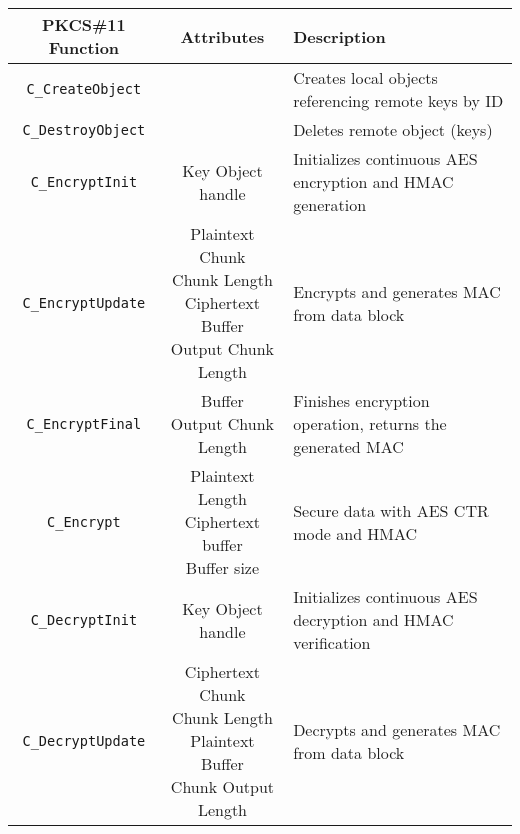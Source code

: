\begin{table}[]
\centering
\def\arraystretch{1.5}
	\begin{tabular}{|c|c|l|}
	\hline
	\textbf{PKCS\#11 Function} & \textbf{Attributes} & \textbf{Description} \\ \hline
	\texttt{C\_CreateObject}	& & Creates local objects referencing remote keys by ID \\ \hline
	\texttt{C\_DestroyObject}	& & Deletes remote object (keys)\\ \hline
	\texttt{C\_EncryptInit}		& Key Object handle & Initializes continuous AES encryption and HMAC generation \\ \hline
	\texttt{C\_EncryptUpdate}	& \makecell{Plaintext Chunk\\Chunk Length\\Ciphertext Buffer\\Output Chunk Length} & Encrypts and generates MAC from data block \\ \hline
	\texttt{C\_EncryptFinal}	& \makecell{Buffer\\Output Chunk Length} & Finishes encryption operation, returns the generated MAC\\ \hline
	\texttt{C\_Encrypt}		& \makecell{Plaintext\\Length\\Ciphertext buffer\\Buffer size} & Secure data with AES CTR mode and HMAC\\ \hline
	\texttt{C\_DecryptInit}		& Key Object handle & Initializes continuous AES decryption and HMAC verification\\ \hline
	\texttt{C\_DecryptUpdate}	& \makecell{Ciphertext Chunk\\Chunk Length\\Plaintext Buffer\\Chunk Output Length} & Decrypts and generates MAC from data block\\ \hline

\end{tabular}
\end{table}
